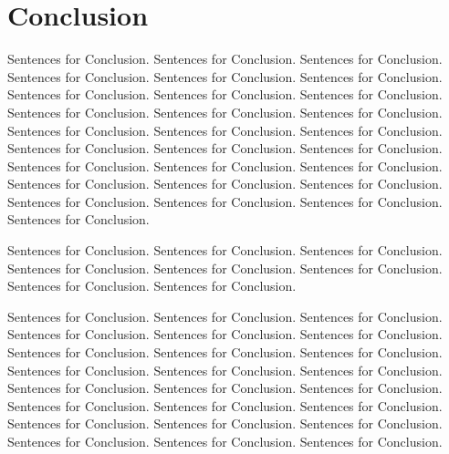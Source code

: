 \chapter{Conclusion}

Sentences for Conclusion.  Sentences for Conclusion.  
Sentences for Conclusion.  Sentences for Conclusion.  
Sentences for Conclusion.  Sentences for Conclusion.  
Sentences for Conclusion.  Sentences for Conclusion.  
Sentences for Conclusion.  Sentences for Conclusion.  
Sentences for Conclusion.  Sentences for Conclusion.  
Sentences for Conclusion.  Sentences for Conclusion.  
Sentences for Conclusion.  Sentences for Conclusion.  
Sentences for Conclusion.  Sentences for Conclusion.  
Sentences for Conclusion.  Sentences for Conclusion.  
Sentences for Conclusion.  Sentences for Conclusion.  
Sentences for Conclusion.  Sentences for Conclusion.  
Sentences for Conclusion.  Sentences for Conclusion.  
Sentences for Conclusion.  Sentences for Conclusion.  

Sentences for Conclusion.  Sentences for Conclusion.  
Sentences for Conclusion.  Sentences for Conclusion.  
Sentences for Conclusion.  Sentences for Conclusion.  
Sentences for Conclusion.  Sentences for Conclusion.  

Sentences for Conclusion.  Sentences for Conclusion.  
Sentences for Conclusion.  Sentences for Conclusion.  
Sentences for Conclusion.  Sentences for Conclusion.  
Sentences for Conclusion.  Sentences for Conclusion.  
Sentences for Conclusion.  Sentences for Conclusion.  
Sentences for Conclusion.  Sentences for Conclusion.  
Sentences for Conclusion.  Sentences for Conclusion.  
Sentences for Conclusion.  Sentences for Conclusion.  
Sentences for Conclusion.  Sentences for Conclusion.  
Sentences for Conclusion.  Sentences for Conclusion.  
Sentences for Conclusion.  Sentences for Conclusion.  
Sentences for Conclusion.  Sentences for Conclusion.  

